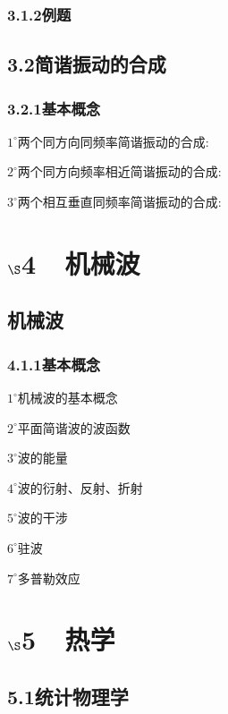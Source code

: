 \documentclass[UTF8]{ctexart}
\begin{document}
	\subsubsection*{3.1.2例题}



	\subsection*{3.2简谐振动的合成}
	\subsubsection*{3.2.1基本概念}
	$1^{\circ}$两个同方向同频率简谐振动的合成:



	$2^{\circ}$两个同方向频率相近简谐振动的合成:

	$3^{\circ}$两个相互垂直同频率简谐振动的合成:

\newpage
	\section*{$\S$4~~机械波}
	\subsection*{机械波}
	\subsubsection*{4.1.1基本概念}
	$1^{\circ}$机械波的基本概念

	$2^{\circ}$平面简谐波的波函数

	$3^{\circ}$波的能量

	$4^{\circ}$波的衍射、反射、折射

	$5^{\circ}$波的干涉

	$6^{\circ}$驻波

	$7^{\circ}$多普勒效应

\newpage
	\section*{$\S$5~~热学}
	\subsection*{5.1统计物理学}
\end{document}
